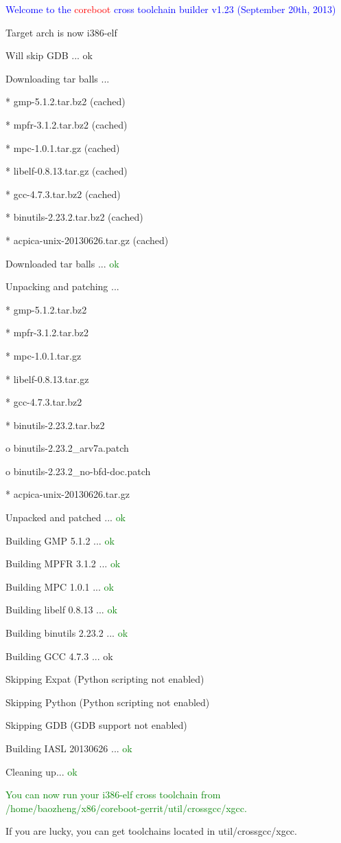 \documentclass[titlepage,12pt]{article}
\begin{document}
{ \small
\textcolor{blue} {Welcome to the} \textcolor{red} {coreboot} \textcolor{blue} {cross toolchain builder v1.23 (September 20th, 2013)}

Target arch is now i386-elf

Will skip GDB ... ok

Downloading tar balls ...

 * gmp-5.1.2.tar.bz2 (cached)

 * mpfr-3.1.2.tar.bz2 (cached)

 * mpc-1.0.1.tar.gz (cached)

 * libelf-0.8.13.tar.gz (cached)

 * gcc-4.7.3.tar.bz2 (cached)

 * binutils-2.23.2.tar.bz2 (cached)

 * acpica-unix-20130626.tar.gz (cached)

Downloaded tar balls ... \textcolor {green}{ok}

Unpacking and patching ...

 * gmp-5.1.2.tar.bz2

 * mpfr-3.1.2.tar.bz2

 * mpc-1.0.1.tar.gz

 * libelf-0.8.13.tar.gz

 * gcc-4.7.3.tar.bz2

 * binutils-2.23.2.tar.bz2

   o binutils-2.23.2\_arv7a.patch

   o binutils-2.23.2\_no-bfd-doc.patch

 * acpica-unix-20130626.tar.gz

Unpacked and patched ... \textcolor {green}{ok}

Building GMP 5.1.2 ... \textcolor {green}{ok}

Building MPFR 3.1.2 ... \textcolor {green}{ok}

Building MPC 1.0.1 ... \textcolor {green}{ok}

Building libelf 0.8.13 ... \textcolor {green}{ok}

Building binutils 2.23.2 ... \textcolor {green}{ok}

Building GCC 4.7.3 ...  ok

Skipping Expat (Python scripting not enabled)

Skipping Python (Python scripting not enabled)

Skipping GDB (GDB support not enabled)

Building IASL 20130626 ... \textcolor {green}{ok}

Cleaning up... \textcolor {green}{ok}

\textcolor {green}{You can now run your i386-elf cross toolchain from /home/baozheng/x86/coreboot-gerrit/util/crossgcc/xgcc.}
}
If you are lucky, you can get toolchains located in util/crossgcc/xgcc.
\end{document}
